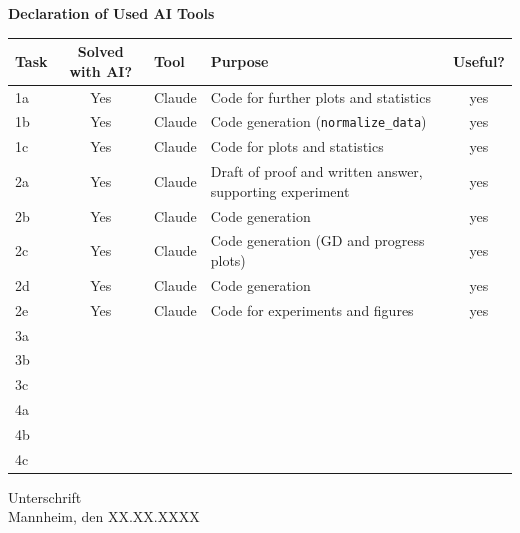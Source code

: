 %
%
%
\begin{center}
  \textbf{Declaration of Used AI Tools} \\[.3em]
  \begin{tabularx}{\textwidth}{lclXc}
    \toprule
    Task & Solved with AI? & Tool & Purpose & Useful? \\
    \midrule
    1a & Yes & Claude & Code for further plots and statistics & yes \\
    1b & Yes & Claude & Code generation (\texttt{normalize\_data}) & yes \\
    1c & Yes & Claude & Code for plots and statistics & yes \\
    2a & Yes & Claude & Draft of proof and written answer, supporting experiment & yes \\
    2b & Yes & Claude & Code generation & yes \\
    2c & Yes & Claude & Code generation (GD and progress plots) & yes \\
    2d & Yes & Claude & Code generation & yes \\
    2e & Yes & Claude & Code for experiments and figures & yes \\
    3a \\
    3b \\
    3c \\
    4a \\
    4b \\
    4c \\
    \bottomrule
  \end{tabularx}
\end{center}

\vspace{2cm}
\noindent Unterschrift\\
\noindent Mannheim, den XX.XX.XXXX \hfill

